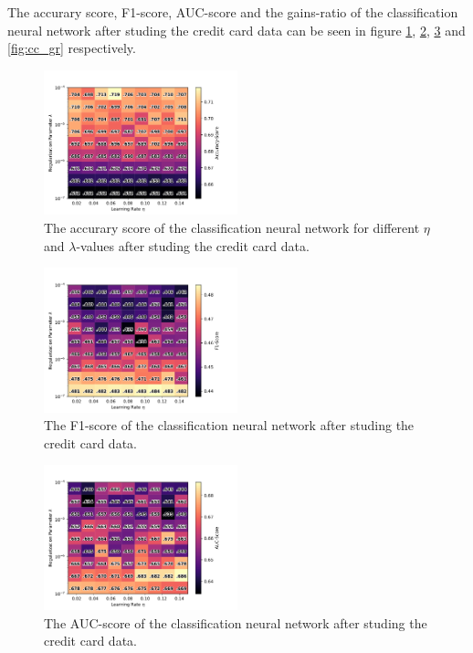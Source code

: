 		The accurary score, F1-score, AUC-score and the gains-ratio of the classification neural network after studing the credit card data can be seen in figure \ref{fig:cc_acc}, \ref{fig:cc_F1}, \ref{fig:cc_auc} and \ref{fig:cc_gr} respectively.

		\begin{figure}[H]
			\centering
			\includegraphics[width=0.5\textwidth]{figures/cc_res_0.pdf}
			\caption{The accurary score of the classification neural network for different $\eta$ and $\lambda$-values after studing the credit card data.}
			\label{fig:cc_acc}
		\end{figure}
		\begin{figure}[H]
			\centering
			\includegraphics[width=0.5\textwidth]{figures/cc_res_1.pdf}
			\caption{The F1-score of the classification neural network after studing the credit card data.}
			\label{fig:cc_F1}
		\end{figure}
		\begin{figure}[H]
			\centering
			\includegraphics[width=0.5\textwidth]{figures/cc_res_2.pdf}
			\caption{The AUC-score of the classification neural network after studing the credit card data.}
			\label{fig:cc_auc}
		\end{figure}
